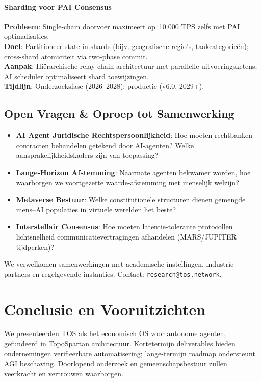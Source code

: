 \documentclass[11pt]{article}
\begin{document}
\paragraph{Sharding voor PAI Consensus}
\textbf{Probleem}: Single-chain doorvoer maximeert op~10.000 TPS zelfs met PAI optimalisaties.\\
\textbf{Doel}: Partitioneer state in shards (bijv. geografische regio's, taakcategorieën); cross-shard atomiciteit via two-phase commit.\\
\textbf{Aanpak}: Hiërarchische relay chain architectuur met parallelle uitvoeringsketens; AI scheduler optimaliseert shard toewijzingen.\\
\textbf{Tijdlijn}: Onderzoeksfase (2026--2028); productie (v6.0, 2029+).

\subsection{Open Vragen \& Oproep tot Samenwerking}

\begin{itemize}[noitemsep]
  \item \textbf{AI Agent Juridische Rechtspersoonlijkheid}: Hoe moeten rechtbanken contracten behandelen getekend door AI-agenten? Welke aansprakelijkheidskaders zijn van toepassing?
  \item \textbf{Lange-Horizon Afstemming}: Naarmate agenten bekwamer worden, hoe waarborgen we voortgezette waarde-afstemming met menselijk welzijn?
  \item \textbf{Metaverse Bestuur}: Welke constitutionele structuren dienen gemengde mens--AI populaties in virtuele werelden het beste?
  \item \textbf{Interstellair Consensus}: Hoe moeten latentie-tolerante protocollen lichtsnelheid communicatievertragingen afhandelen (MARS/JUPITER tijdperken)?
\end{itemize}

We verwelkomen samenwerkingen met academische instellingen, industrie partners en regelgevende instanties. Contact: \texttt{research@tos.network}.

\section{Conclusie en Vooruitzichten}
We presenteerden TOS als het economisch OS voor autonome agenten, gefundeerd in TopoSpartan architectuur. Kortetermijn deliverables bieden ondernemingen verifieerbare automatisering; lange-termijn roadmap ondersteunt AGI beschaving. Doorlopend onderzoek en gemeenschapsbestuur zullen veerkracht en vertrouwen waarborgen.
\end{document}
